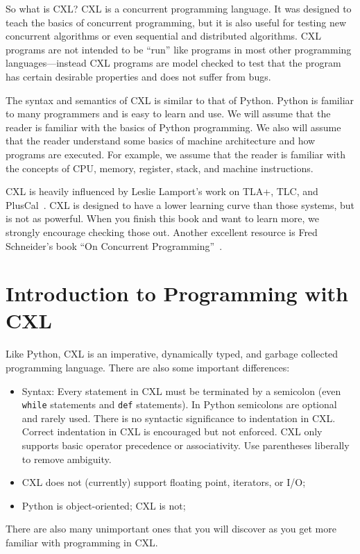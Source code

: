 \documentclass{report}
\begin{document}
So what is CXL?
CXL is a concurrent programming language.  It was designed to teach
the basics of concurrent programming, but it is also useful for
testing new concurrent algorithms or even sequential and distributed
algorithms.  CXL programs are not intended to be ``run'' like programs
in most other programming languages---instead CXL programs are
model checked to test that the program has certain desirable
properties and does not suffer from bugs.

The syntax and semantics of CXL is similar to that of Python.
Python is familiar to many programmers and is easy to learn and
use.  We will assume that the reader is familiar with the basics
of Python programming.  We also will assume that the reader
understand some basics of machine architecture and how programs
are executed.  For example, we assume that the reader is familiar
with the concepts of CPU, memory, register, stack, and machine
instructions.

CXL is heavily influenced by Leslie Lamport's work on
TLA+, TLC, and PlusCal~\cite{Lamport02, Lamport09}.
CXL is designed to have a lower learning curve than those
systems, but is not as powerful.  When you finish this book
and want to learn more, we strongly encourage checking
those out.
Another excellent resource is Fred Schneider's book ``On
Concurrent Programming''~\cite{Schneider97}.

\chapter{Introduction to Programming with CXL}

Like Python, CXL is an imperative,
dynamically typed, and garbage collected programming language.
There are also some important differences:
\begin{itemize}
\item Syntax: Every statement in CXL must be terminated by a semicolon
(even \texttt{while} statements and \texttt{def} statements).
In Python semicolons are optional and rarely used.
There is no syntactic significance to indentation in CXL.
Correct indentation in CXL is encouraged but not enforced.
CXL only supports basic operator precedence or associativity.
Use parentheses liberally to remove ambiguity.
\item CXL does not (currently) support floating point, iterators, or I/O;
\item Python is object-oriented; CXL is not;
\end{itemize}
There are also many unimportant ones that you will discover as
you get more familiar with programming in CXL.
\end{document}
